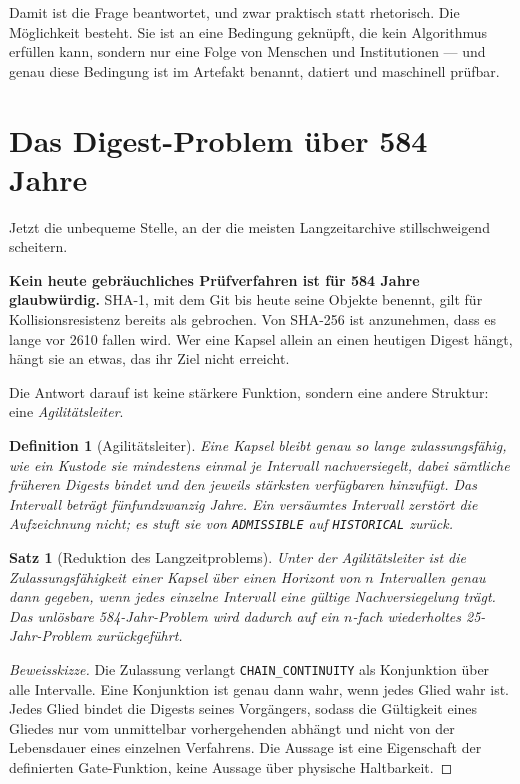 \documentclass[11pt,a4paper]{article}
\newtheorem{definition}{Definition}[section]
\newtheorem{satz}{Satz}[section]
\theoremstyle{remark}
\begin{document}
Damit ist die Frage beantwortet, und zwar praktisch statt rhetorisch. Die
Möglichkeit besteht. Sie ist an eine Bedingung geknüpft, die kein
Algorithmus erfüllen kann, sondern nur eine Folge von Menschen und
Institutionen --- und genau diese Bedingung ist im Artefakt benannt, datiert
und maschinell prüfbar.

\section{Das Digest-Problem über 584 Jahre}

Jetzt die unbequeme Stelle, an der die meisten Langzeitarchive stillschweigend
scheitern.

\textbf{Kein heute gebräuchliches Prüfverfahren ist für 584 Jahre
glaubwürdig.} SHA-1, mit dem Git bis heute seine Objekte benennt, gilt für
Kollisionsresistenz bereits als gebrochen. Von SHA-256 ist anzunehmen, dass
es lange vor 2610 fallen wird. Wer eine Kapsel allein an einen heutigen
Digest hängt, hängt sie an etwas, das ihr Ziel nicht erreicht.

Die Antwort darauf ist keine stärkere Funktion, sondern eine andere
Struktur: eine \emph{Agilitätsleiter}.

\begin{definition}[Agilitätsleiter]
Eine Kapsel bleibt genau so lange zulassungsfähig, wie ein Kustode sie
mindestens einmal je Intervall nachversiegelt, dabei sämtliche früheren
Digests bindet und den jeweils stärksten verfügbaren hinzufügt. Das
Intervall beträgt fünfundzwanzig Jahre. Ein versäumtes Intervall zerstört
die Aufzeichnung nicht; es stuft sie von \texttt{ADMISSIBLE} auf
\texttt{HISTORICAL} zurück.
\end{definition}

\begin{satz}[Reduktion des Langzeitproblems]
Unter der Agilitätsleiter ist die Zulassungsfähigkeit einer Kapsel über
einen Horizont von $n$ Intervallen genau dann gegeben, wenn jedes einzelne
Intervall eine gültige Nachversiegelung trägt. Das unlösbare
584-Jahr-Problem wird dadurch auf ein $n$-fach wiederholtes
25-Jahr-Problem zurückgeführt.
\end{satz}

\begin{proof}[Beweisskizze]
Die Zulassung verlangt \texttt{CHAIN\_CONTINUITY} als Konjunktion über alle
Intervalle. Eine Konjunktion ist genau dann wahr, wenn jedes Glied wahr ist.
Jedes Glied bindet die Digests seines Vorgängers, sodass die Gültigkeit
eines Gliedes nur vom unmittelbar vorhergehenden abhängt und nicht von der
Lebensdauer eines einzelnen Verfahrens. Die Aussage ist eine Eigenschaft der
definierten Gate-Funktion, keine Aussage über physische Haltbarkeit.
\end{proof}
\end{document}
